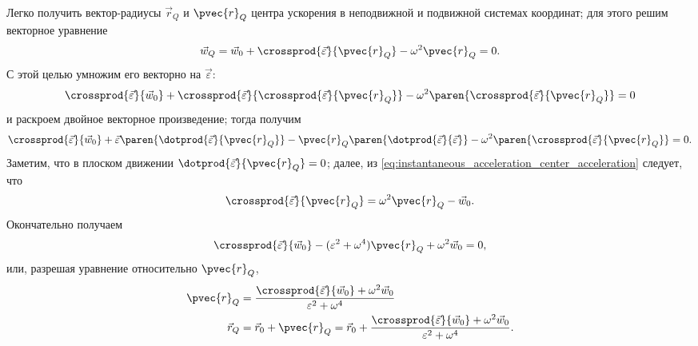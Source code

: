 Легко получить вектор-радиусы $\vec{r}_Q$ и $\pvec{r}_Q$ центра ускорения в
неподвижной и подвижной системах координат; для этого решим векторное уравнение
\begin{equation}
  \label{eq:instantaneous_acceleration_center_acceleration}
  \vec{w}_Q = \vec{w}_0 + \crossprod{\vec{\varepsilon}}{\pvec{r}_Q} - \omega^2
    \pvec{r}_Q = 0.
\end{equation}
С этой целью умножим его векторно на $\vec{\varepsilon}$:
\begin{equation*}
  \crossprod{\vec{\varepsilon}}{\vec{w}_0} + \crossprod{\vec{\varepsilon}}
    {\crossprod{\vec{\varepsilon}}{\pvec{r}_Q}} - \omega^2 \paren{
      \crossprod{\vec{\varepsilon}}{\pvec{r}_Q} } = 0
\end{equation*}
и раскроем двойное векторное произведение; тогда получим
\begin{equation*}
  \crossprod{\vec{\varepsilon}}{\vec{w}_0} + \vec{\varepsilon} \paren{
    \dotprod{\vec{\varepsilon}}{\pvec{r}_Q} } - \pvec{r}_Q \paren{
    \dotprod{\vec{\varepsilon}}{\vec{\varepsilon}} } - \omega^2 \paren{
    \crossprod{\vec{\varepsilon}}{\pvec{r}_Q} } = 0.
\end{equation*}
Заметим, что в плоском движении $\dotprod{\vec{\varepsilon}}{\pvec{r}_Q} = 0$;
далее, из \ref{eq:instantaneous_acceleration_center_acceleration} следует, что
\begin{equation*}
  \crossprod{\vec{\varepsilon}}{\pvec{r}_Q} = \omega^2 \pvec{r}_Q - \vec{w}_0.
\end{equation*}
Окончательно получаем
\begin{equation*}
  \crossprod{\vec{\varepsilon}}{\vec{w}_0} - (\varepsilon^2 + \omega^4)
    \pvec{r}_Q + \omega^2 \vec{w}_0 = 0,
\end{equation*}
или, разрешая уравнение относительно $\pvec{r}_Q$,
\begin{equation*}
  \begin{aligned}
    \pvec{r}_Q &= \frac
      {\crossprod{\vec{\varepsilon}}{\vec{w}_0} + \omega^2 \vec{w}_0}
      {\varepsilon^2 + \omega^4} \\
    \vec{r}_Q &= \vec{r}_0 + \pvec{r}_Q =
      \vec{r}_0 + \frac
      {\crossprod{\vec{\varepsilon}}{\vec{w}_0} + \omega^2 \vec{w}_0}
      {\varepsilon^2 + \omega^4}.
  \end{aligned}
\end{equation*}

